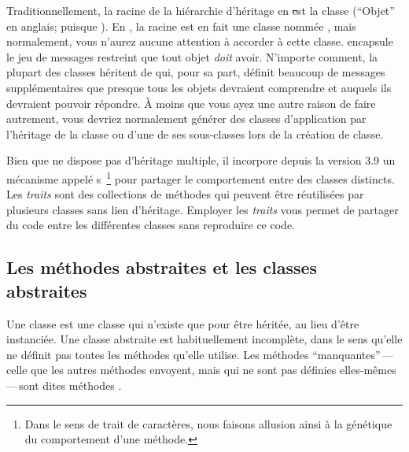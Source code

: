 \documentclass[a4paper,10pt,twoside]{book}
\begin{document}
Traditionnellement, la racine de la hi\'erarchie d'h\'eritage en \st est la classe  (``Objet'' en anglais; puisque \mantra).
En \squeak, la racine est en fait une classe nomm\'ee , mais
normalement, vous n'aurez aucune attention \`a accorder \`a cette classe.
 encapsule le jeu de messages restreint que tout objet \emph{doit} avoir.  
N'importe comment, la plupart des classes h\'eritent de  qui, pour
sa part, d\'efinit beaucoup de messages suppl\'ementaires que presque tous les
objets devraient comprendre et auquels ils devraient pouvoir r\'epondre.
\`A moins que vous ayez une autre raison de faire autrement, vous devriez
normalement g\'en\'erer des classes d'application par l'h\'eritage
de la classe  ou d'une de ses sous-classes lors de la cr\'eation de classe.



Bien que \squeak ne dispose pas d'h\'eritage multiple, il incorpore depuis la version 3.9 un m\'ecanisme appel\'e 
s~\footnote{Dans le sens de trait de caract\`eres, nous faisons allusion ainsi \`a la g\'en\'etique du comportement d'une m\'ethode.} 
pour partager le comportement entre des classes distincts.
Les \emph{traits} sont des collections de m\'ethodes qui peuvent \^etre r\'eutilis\'ees par plusieurs classes sans lien d'h\'eritage. Employer les \emph{traits} vous permet de partager du code entre les diff\'erentes classes sans reproduire ce code.

\subsection{Les m\'ethodes abstraites et les classes abstraites}

Une classe  est une classe qui n'existe que pour \^etre h\'erit\'ee, au lieu d'\^etre instanci\'ee.
Une classe abstraite est habituellement incompl\`ete, dans le sens qu'elle ne d\'efinit pas toutes les m\'ethodes qu'elle utilise.
Les m\'ethodes ``manquantes''\,---\,celle que les autres m\'ethodes envoyent, mais qui ne sont pas d\'efinies elles-m\^emes\,---\,sont dites m\'e\-tho\-des .
\end{document}
